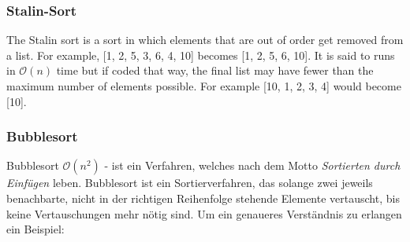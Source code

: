 \documentclass[a4paper]{article}
\begin{document}
\subsubsection{Stalin-Sort}
The Stalin sort is a sort in which elements that are out of order get removed from a list. For example, [1, 2, 5, 3, 6, 4, 10] becomes [1, 2, 5, 6, 10]. It is said to runs in $\mathcal{O}(n)$ time but if coded that way, the final list may have fewer than the maximum number of elements possible. For example [10, 1, 2, 3, 4] would become [10].

\newpage

    \subsubsection{Bubblesort}\label{Bubblesort}
    Bubblesort $\mathcal{O}(n^2)$ - ist ein Verfahren, welches nach dem Motto \textit{Sortierten durch Einfügen} leben. Bubblesort ist ein Sortierverfahren, das solange zwei jeweils
    benachbarte, nicht in der richtigen Reihenfolge stehende Elemente vertauscht, bis keine Vertauschungen mehr nötig sind.
    Um ein genaueres Verständnis zu erlangen ein Beispiel: \\
    
\end{document}
